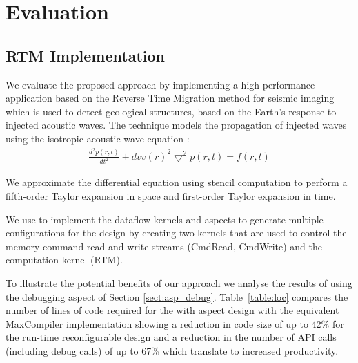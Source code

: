 \chapter{Evaluation}
\label{sec:evaluation}

\section{RTM Implementation}
We evaluate the proposed approach by implementing a high-performance
application based on the Reverse Time Migration method for seismic
imaging which is used to detect geological structures, based on the
Earth's response to injected acoustic waves. The technique models the
propagation of injected waves using the isotropic acoustic wave
equation \cite{araya2011assessing}:
\begin{align}
\frac{d^2p(r,t)}{dt^2} + {dvv(r)}^2\bigtriangledown^2p(r,t) = f(r,t)
\end{align}

We approximate the differential equation using stencil computation to
perform a fifth-order Taylor expansion in space and first-order Taylor
expansion in time.

We use \FAST{} to implement the dataflow kernels and aspects to
generate multiple configurations for the design by creating two
kernels that are used to control the memory command read and write
streams (CmdRead, CmdWrite) and the computation kernel (RTM).

To illustrate the potential benefits of our approach we analyse the
results of using the debugging aspect of Section
\ref{sect:asp_debug}. Table~\ref{table:loc} compares the number of
lines of code required for the \FAST{} with aspect design with the
equivalent MaxCompiler implementation showing a reduction in code size
of up to 42\% for the run-time reconfigurable design and a reduction
in the number of API calls (including debug calls) of up to 67\% which
translate to increased productivity.

